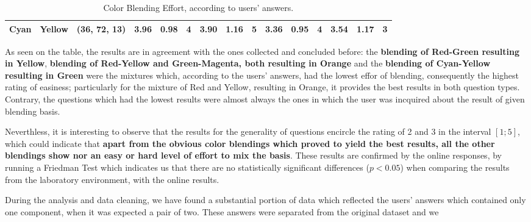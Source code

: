 \begin{table}[htbp]
{\begin{tabular}{@{}ccclcccccccccccc@{}}
    Cyan                    & \multicolumn{1}{c|}{Yellow}                    & \multicolumn{2}{c|}{\cellcolor[HTML]{00FF00}(36, 72, 13)}  & \multicolumn{1}{c|}{3.96} & \multicolumn{1}{c|}{0.98}  & \multicolumn{1}{c|}{4}                                  & \multicolumn{1}{c|}{3.90} & \multicolumn{1}{c|}{1.16}  & \multicolumn{1}{c||}{\cellcolor[HTML]{32CB00}\textbf{5}} & \multicolumn{1}{c|}{3.36}                   & \multicolumn{1}{c|}{0.95}                   & \multicolumn{1}{c|}{4}                                  & \multicolumn{1}{c|}{3.54}                   & \multicolumn{1}{c|}{1.17}                   & \multicolumn{1}{c|}{3}                                                    \\ \bottomrule
  \end{tabular}}
  \caption[Color Blending Effort, according to users' answers.]{Color Blending Effort, according to users' answers.}
  \label{table:difficulties_blendings}
\end{table}
%
As seen on the table, the results are in agreement with the ones collected and concluded before: the \textbf{blending of Red-Green resulting in Yellow}, \textbf{blending of Red-Yellow and Green-Magenta, both resulting in Orange} and the
\textbf{blending of Cyan-Yellow resulting in Green} were the mixtures which, according to the users' answers, had the lowest effor of blending, consequently the highest rating of easiness; particularly for the mixture of Red and Yellow, resulting in
Orange, it provides the best results in both question types. Contrary, the questions which had the lowest results were almost always the ones in which the user was incquired about the result of given blending basis. \par
%
Neverthless, it is interesting to observe that the results for the generality of questions encircle the rating of 2 and 3 in the interval $[1 ; 5]$, which could indicate that \textbf{apart from the obvious color blendings which proved to yield the
best results, all the other blendings show nor an easy or hard level of effort to mix the basis}. These results are confirmed by the online responses, by running a Friedman Test which indicates us that there are no statistically significant differences
($p < 0.05$) when comparing the results from the laboratory environment, with the online results. \par
%
During the analysis and data cleaning, we have found a substantial portion of data which reflected the users' answers which contained only one component, when it was expected a pair of two. These answers were separated from the original dataset and we
